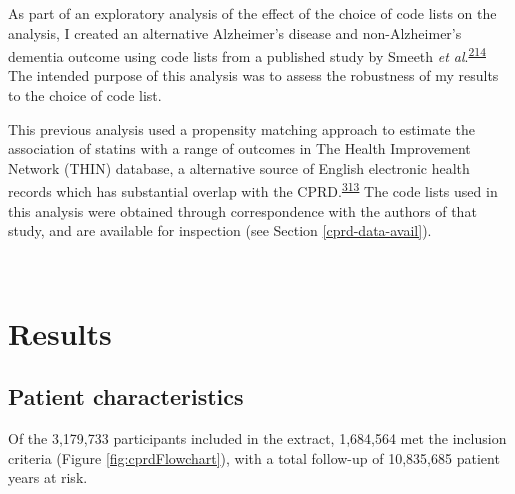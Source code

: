 \documentclass[a4paper, twoside]{templates/ociamthesis}
\begin{document}
As part of an exploratory analysis of the effect of the choice of code lists on the analysis, I created an alternative Alzheimer's disease and non-Alzheimer's dementia outcome using code lists from a published study by Smeeth \emph{et al}.\textsuperscript{\protect\hyperlink{ref-smeeth2009}{214}} The intended purpose of this analysis was to assess the robustness of my results to the choice of code list.

This previous analysis used a propensity matching approach to estimate the association of statins with a range of outcomes in The Health Improvement Network (THIN) database, a alternative source of English electronic health records which has substantial overlap with the CPRD.\textsuperscript{\protect\hyperlink{ref-carbonari2015}{313}} The code lists used in this analysis were obtained through correspondence with the authors of that study, and are available for inspection (see Section \ref{cprd-data-avail}).

~

\hypertarget{results}{%
\section{Results}\label{results}}

\hypertarget{patient-characteristics}{%
\subsection{Patient characteristics}\label{patient-characteristics}}

Of the 3,179,733 participants included in the extract, 1,684,564 met the inclusion criteria (Figure \ref{fig:cprdFlowchart}), with a total follow-up of 10,835,685 patient years at risk.

~
\end{document}
